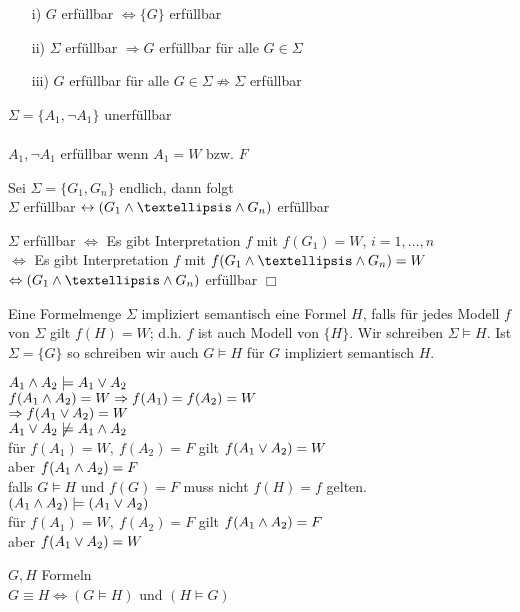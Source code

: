 \beweis{}
\begin{enumerate}
\item[i)] $G$ erfüllbar $\Leftrightarrow \{G\}$ erfüllbar
\item[ii)] $\Sigma$ erfüllbar $\Rightarrow G$ erfüllbar für alle $G \in \Sigma$
\item[iii)] $G$ erfüllbar für alle $G \in \Sigma \not \Rightarrow \Sigma$ erfüllbar
\end{enumerate}
$\Sigma = \{A_1, \neg A_1 \}$ unerfüllbar\\
\noindent\\
$A_1, \neg A_1$ erfüllbar wenn $A_1 = W$ bzw. $F$

Sei $\Sigma = \{G_1, G_n \}$ endlich, dann folgt\\
$\Sigma$ erfüllbar $\leftrightarrow (G_1 \AND … \AND G_n)$ erfüllbar

\beweis{}
$\Sigma$ erfüllbar $\Leftrightarrow$ Es gibt Interpretation $f$ mit $f(G_1) = W$, $i=1, …, n$\\
$\Leftrightarrow$ Es gibt Interpretation $f$ mit $f(G_1 \AND … \AND G_n) = W$\\
$\Leftrightarrow ( G_1 \AND … \AND G_n)$ erfüllbar $\Box$

Eine Formelmenge $\Sigma$ impliziert semantisch eine Formel $H$, falls für jedes Modell $f$ von $\Sigma$ gilt $f(H) = W$; d.h. $f$ ist auch Modell von $\{H\}$. Wir schreiben $\Sigma \models H$. Ist $\Sigma = \{G\}$ so schreiben wir auch $G \models H $ für $G$ impliziert semantisch $H$.

\beispiel{}
$A_1 \wedge A_2 \models A_1 \vee A_2$\\
$f(A_1 \wedge A_2) = W \Rightarrow f(A_1) = f(A_2) = W$\\
$\Rightarrow f(A_1 \vee A_2) = W$\\
$A_1 \vee A_2 \not \models A_1 \wedge A_2$\\

\noindent
für $f(A_1) = W,\ f(A_2) = F$ gilt $f(A_1 \vee A_2) = W$\\
aber $f(A_1 \wedge A_2) = F$\\
falls $G \models H$ und $f(G) = F$ muss nicht $f(H) = f$ gelten.\\
$(A_1 \wedge A_2) \models (A_1 \vee A_2)$\\
für $f(A_1) = W,\ f(A_2)=F$ gilt $f(A_1 \wedge A_2) = F$\\
aber $f(A_1 \vee A_2 ) = W$

\bemerkung{}
$G, H$ Formeln\\
$G \equiv H \Leftrightarrow ( G \models H)$ und $(H \models G)$\\


